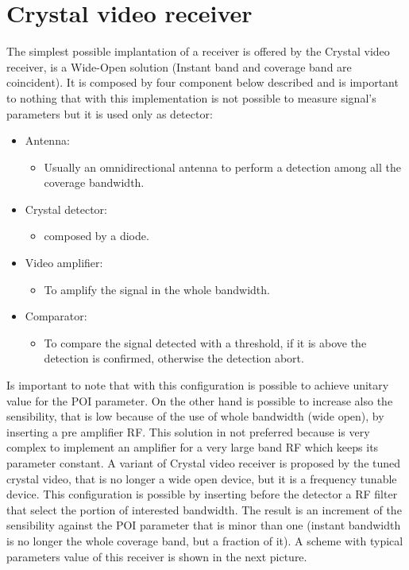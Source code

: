 \documentclass[12pt]{report}
\begin{document}
\section{Crystal video receiver} The simplest possible implantation of a receiver is offered by the Crystal video receiver, is a Wide-Open solution (Instant band and coverage band are coincident). It is composed by four component below described and is important to nothing that with this implementation is not possible to measure signal's parameters but it is used only as detector:
\begin{itemize}
     \item Antenna: 
         \begin{itemize}
         \item Usually an omnidirectional antenna to perform a detection among all the coverage bandwidth.
         \end{itemize}
    \item Crystal detector: 
         \begin{itemize}
         \item composed by a diode.
        \end{itemize}
    \item Video amplifier:
         \begin{itemize}
         \item To amplify the signal in the whole bandwidth.
         \end{itemize}
    \item Comparator:    
         \begin{itemize}
         \item To compare the signal detected with a threshold, if it is above the detection is confirmed, otherwise the detection abort.
         \end{itemize}
\end{itemize}

Is important to note that with this configuration is possible to achieve unitary value for the POI parameter. On the other hand is possible to increase also the sensibility, that is low because of the use of whole bandwidth (wide open), by inserting a pre amplifier RF. This solution in not preferred because is very complex to implement an amplifier for a very large band RF which keeps its parameter constant. A variant of Crystal video receiver is proposed by the tuned crystal video, that is no longer a wide open device, but it is a frequency tunable device. This configuration is possible by inserting before the detector a RF filter that select the portion of interested bandwidth. The result is an increment of the sensibility against the POI parameter that is minor than one (instant bandwidth is no longer the whole coverage band, but a fraction of it). A scheme with typical parameters value of this receiver is shown in the next picture.
\end{document}
